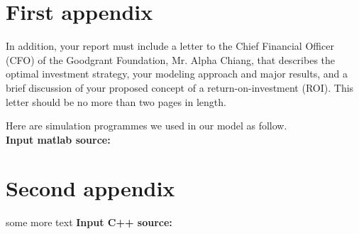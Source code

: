 \documentclass{mcmthesis}
\begin{document}
\newpage

\begin{appendices}

\section{First appendix}

In addition, your report must include a letter to the Chief Financial Officer (CFO) of the Goodgrant Foundation, Mr. Alpha Chiang, that describes the optimal investment strategy, your modeling approach and major results, and a brief discussion of your proposed concept of a return-on-investment (ROI). This letter should be no more than two pages in length.

Here are simulation programmes we used in our model as follow.\\

\textbf{\textcolor[rgb]{0.98,0.00,0.00}{Input matlab source:}}


\section{Second appendix}

some more text \textcolor[rgb]{0.98,0.00,0.00}{\textbf{Input C++ source:}}


\end{appendices}
\end{document}
